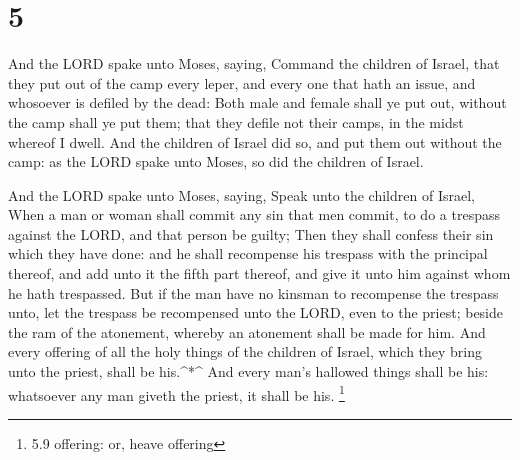 \hypertarget{section-4}{%
\section{5}\label{section-4}}

 And the LORD spake unto Moses, saying,  Command
the children of Israel, that they put out of the camp every leper, and
every one that hath an issue, and whosoever is defiled by the dead:
 Both male and female shall ye put out, without the camp
shall ye put them; that they defile not their camps, in the midst
whereof I dwell.  And the children of Israel did so, and put
them out without the camp: as the LORD spake unto Moses, so did the
children of Israel.

 And the LORD spake unto Moses, saying,  Speak
unto the children of Israel, When a man or woman shall commit any sin
that men commit, to do a trespass against the LORD, and that person be
guilty;  Then they shall confess their sin which they have
done: and he shall recompense his trespass with the principal thereof,
and add unto it the fifth part thereof, and give it unto him against
whom he hath trespassed.  But if the man have no kinsman to
recompense the trespass unto, let the trespass be recompensed unto the
LORD, even to the priest; beside the ram of the atonement, whereby an
atonement shall be made for him.  And every offering of all
the holy things of the children of Israel, which they bring unto the
priest, shall be his.\^{}*\^{}  And every man's hallowed
things shall be his: whatsoever any man giveth the priest, it shall be
his. \footnote{5.9 offering: or, heave offering}

